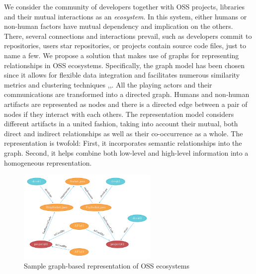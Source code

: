  
We consider the community of developers together with OSS projects, libraries and their mutual interactions as an \emph{ecosystem}. In this system, either humans or non-human factors have mutual dependency and implication on the others. There, several connections and interactions prevail, such as developers commit to repositories, users star repositories, or projects contain source code files, just to name a few. We propose a solution that makes use of graphs for representing relationships in OSS ecosystems. Specifically, the graph model has been chosen since it allows for flexible data integration and facilitates numerous similarity metrics and clustering techniques \cite{Blondel:2004:MSG:1035533.1035557},\cite{Lu2007},\cite{Schaeffer:2007:SGC:2296006.2296057}. All the playing actors and their communications are transformed into a directed graph. Humans and non-human artifacts are represented as nodes and there is a directed edge between a pair of nodes if they interact with each others. The representation model considers different artifacts in a united fashion, taking into account their mutual, both direct and indirect relationships as well as their co-occurrence as a whole. The representation is twofold: First, it incorporates semantic relationships into the graph. Second, it helps combine both low-level and high-level information into a homogeneous representation.
 
 
 
 \begin{figure}[t!]
 	\centering
 	\includegraphics[width=0.60\textwidth]{images/OSSGraph1.pdf}
 	\caption{Sample graph-based representation of OSS ecosystems}
 	\label{fig:OSSGraph1}
 \end{figure}
 
